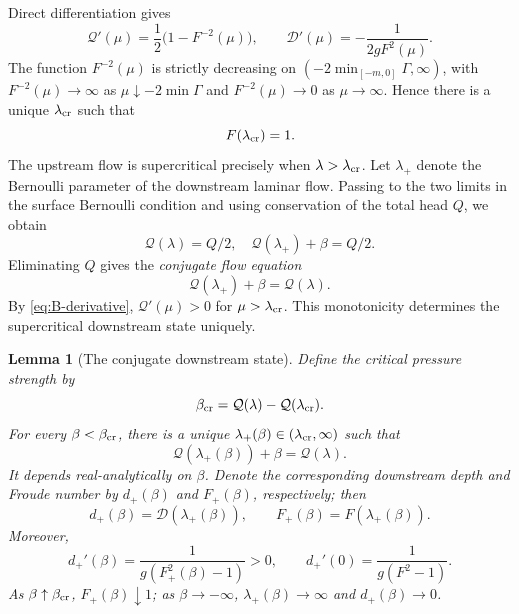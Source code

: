 \documentclass[12pt,letterpaper]{amsart}
\newtheorem{lemma}[theorem]{Lemma}
\numberwithin{equation}{section}
\begin{document}
	{Direct differentiation gives}
	\begin{equation}\label{eq:B-derivative}
	\mathcal{Q}'(\mu)=\frac12\bigl(1-F^{-2}(\mu)\bigr),
		\qquad
		\mathcal{D}'(\mu)=-\frac1{2gF^2(\mu)}.
	\end{equation}
	{The function $F^{-2}(\mu)$ is strictly decreasing on $(-2\min_{[-m,0]}\Gamma,\infty)$, with $F^{-2}(\mu)\to\infty$ as $\mu\downarrow-2\min\Gamma$ and $F^{-2}(\mu)\to0$ as $\mu\to\infty$. Hence there is a unique $\lambda_{\rm cr}$ such that}
	\begin{equation*}
		F(\lambda_{\rm cr})=1.
	\end{equation*}
{The upstream flow is supercritical precisely when $\lambda>\lambda_{\rm cr}$. Let $\lambda_+$ denote the Bernoulli parameter of the downstream laminar flow. Passing to the two limits in the surface Bernoulli condition and using conservation of the total head $Q$, we obtain}
	\begin{equation*}
	\mathcal{Q}(\lambda)=Q/2,\quad \mathcal{Q}(\lambda_+)+\beta=Q/2.
	\end{equation*}
	{Eliminating $Q$ gives the \emph{conjugate flow equation}}
	\begin{equation*}
		\mathcal{Q}(\lambda_+)+\beta=\mathcal{Q}(\lambda).
	\end{equation*}
	{By \eqref{eq:B-derivative}, $\mathcal Q'(\mu)>0$ for $\mu>\lambda_{\rm cr}$. This monotonicity determines the supercritical downstream state uniquely.}
	\begin{lemma}[{The conjugate downstream state}]\label{lem:downstream-state}
		{Define the critical pressure strength by}
		\[\beta_{\rm cr}=\mathcal Q(\lambda)-\mathcal{Q}(\lambda_{\rm cr}).\]
		{For every $\beta<\beta_{\rm cr}$, there is a unique}
		\(\lambda_+(\beta)\in(\lambda_{\rm cr},\infty)\) such that
		\begin{equation}\label{eq:conjugate}
			\mathcal{Q}(\lambda_+(\beta))+\beta=\mathcal{Q}(\lambda).
		\end{equation}
		{It depends real-analytically on $\beta$. Denote the corresponding downstream depth and Froude number by $d_+(\beta)$ and $F_+(\beta)$, respectively; then}
		\begin{equation*}
			d_+(\beta)=\mathcal D(\lambda_+(\beta)),\qquad
			F_+(\beta)=F(\lambda_+(\beta)).
		\end{equation*}
		Moreover,
		\begin{equation}\label{eq:depth-derivative}
			d_+'(\beta)=\frac{1}{g(F_+^2(\beta)-1)}>0,
			\qquad d_+'(0)=\frac1{g(F^2-1)}.
		\end{equation}
		As \(\beta\uparrow\beta_{\rm cr}\), \(F_+(\beta)\downarrow1\); as
		\(\beta\to-\infty\), \(\lambda_+(\beta)\to\infty\) and \(d_+(\beta)\to0\).
	\end{lemma}
\end{document}
